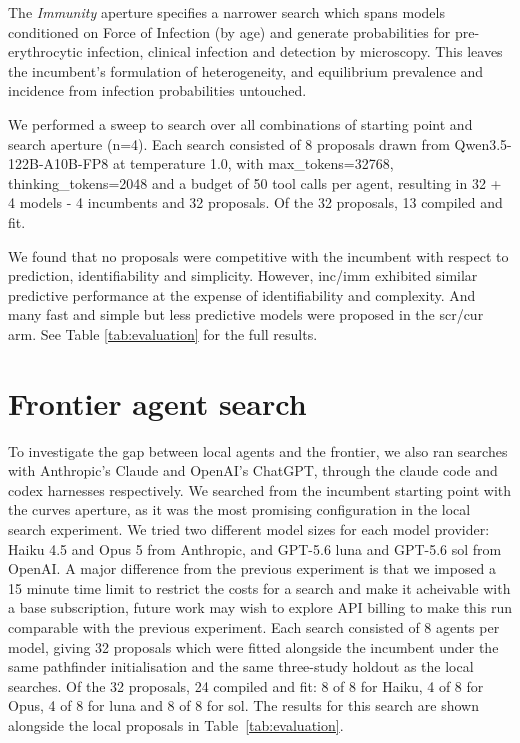 \documentclass[11pt]{article}
\begin{document}
The \emph{Immunity} aperture specifies a narrower search which spans models conditioned on Force of Infection (by age) and generate probabilities for pre-erythrocytic infection, clinical infection and detection by microscopy. This leaves the incumbent's formulation of heterogeneity, and equilibrium prevalence and incidence from infection probabilities untouched.

We performed a sweep to search over all combinations of starting point and search aperture (n=4). Each search consisted of 8 proposals drawn from Qwen3.5-122B-A10B-FP8 at temperature 1.0, with max\_tokens=32768, thinking\_tokens=2048 and a budget of 50 tool calls per agent, resulting in 32 + 4 models - 4 incumbents and 32 proposals. Of the 32 proposals, 13 compiled and fit.

We found that no proposals were competitive with the incumbent with respect to prediction, identifiability and simplicity. However, inc/imm exhibited similar predictive performance at the expense of identifiability and complexity. And many fast and simple but less predictive models were proposed in the scr/cur arm. See Table \ref{tab:evaluation} for the full results.

\section{Frontier agent search}

To investigate the gap between local agents and the frontier, we also ran searches with Anthropic's Claude and OpenAI's ChatGPT, through the claude code and codex harnesses respectively. We searched from the incumbent starting point with the curves aperture, as it was the most promising configuration in the local search experiment. We tried two different model sizes for each model provider: Haiku 4.5 and Opus 5 from Anthropic, and GPT-5.6 luna and GPT-5.6 sol from OpenAI. A major difference from the previous experiment is that we imposed a 15 minute time limit to restrict the costs for a search and make it acheivable with a base subscription, future work may wish to explore API billing to make this run comparable with the previous experiment. Each search consisted of 8 agents per model, giving 32 proposals which were fitted alongside the incumbent under the same pathfinder initialisation and the same three-study holdout as the local searches. Of the 32 proposals, 24 compiled and fit: 8 of 8 for Haiku, 4 of 8 for Opus, 4 of 8 for luna and 8 of 8 for sol. The results for this search are shown alongside the local proposals in Table~\ref{tab:evaluation}.
\end{document}
